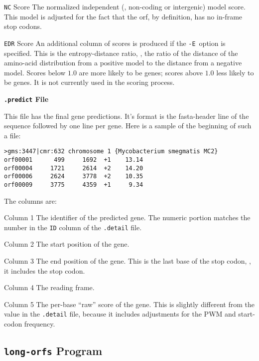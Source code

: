 \documentclass[fleqn,titlepage,11pt]{article}
\def\Pg#1{\texttt{#1}}
\begin{document}
\item[\Pg{NC} Score]
  The normalized independent (\ie, non-coding or intergenic) model score.  This model
  is adjusted for the fact that the orf, by definition, has no in-frame stop codons.

\item[\Pg{EDR} Score]
  An additional column of scores is produced if the \Pg{-E}~option
  is specified.
  This is the entropy-distance ratio, \ie, the ratio of the distance
  of the amino-acid distribution from a positive model to the distance
  from a negative model.  Scores below $1.0$ are more likely to be genes;
  scores above $1.0$ less likely to be genes.
  It is not currently used in the scoring process.
\el

\smallskip
\noindent\textbf{\Pg{.predict} File}
\smallskip

This file has the final gene predictions.  It's format is the fasta-header
line of the sequence followed by one line per gene.  Here is a sample of the
beginning of such a file:
\BSV
\begin{verbatim}
>gms:3447|cmr:632 chromosome 1 {Mycobacterium smegmatis MC2}
orf00001      499     1692  +1    13.14
orf00004     1721     2614  +2    14.20
orf00006     2624     3778  +2    10.35
orf00009     3775     4359  +1     9.34
\end{verbatim}
\ESV
The columns are:
\RaggedRight
\item[Column 1]
  The identifier of the predicted gene.  The numeric portion matches the
  number in the \Pg{ID} column of the \Pg{.detail} file.

\item[Column 2]
  The start position of the gene.

\item[Column 3]
  The end position of the gene.  This is the last base of the stop codon, \ie,
  it includes the stop codon.

\item[Column 4]
  The reading frame.

\item[Column 5]
  The per-base ``raw'' score of the gene.  This is slightly different from the
  value in the \Pg{.detail} file, because it includes adjustments for the
  PWM and start-codon frequency.
\el

\subsection{\Pg{long-orfs} Program}
\end{document}
